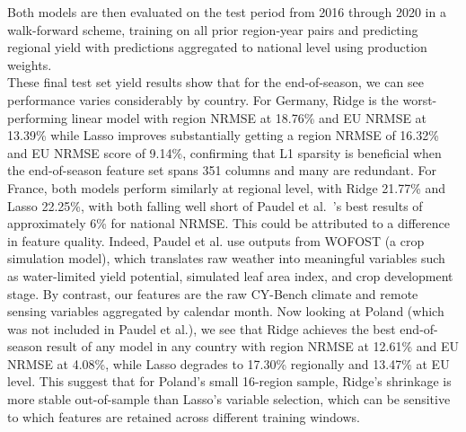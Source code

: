 \documentclass[pdflatex,sn-mathphys-num, oneside, 11pt]{sn-jnl}%
\theoremstyle{thmstyleone}%
\theoremstyle{thmstyletwo}%
\theoremstyle{thmstylethree}%
\begin{document}
Both models are then evaluated on the test period from 2016 through 2020 in a walk-forward scheme, training on all prior region-year pairs and predicting regional yield with predictions aggregated to national level using production weights.\\

These final test set yield results show that for the end-of-season, we can see performance varies considerably by country. For Germany, Ridge is the worst-performing linear model with region NRMSE at 18.76\% and EU NRMSE at 13.39\% while Lasso improves substantially getting a region NRMSE of 16.32\% and EU NRMSE score of 9.14\%, confirming that L1 sparsity is beneficial when the end-of-season feature set spans 351 columns and many are redundant. For France, both models perform similarly at regional level, with Ridge 21.77\% and Lasso 22.25\%, with both falling well short of Paudel et al.~\cite{bib16}'s best results of approximately 6\% for national NRMSE. This could be attributed to a difference in feature quality. Indeed, Paudel et al. use outputs from WOFOST (a crop simulation model), which translates raw weather into meaningful variables such as water-limited yield potential, simulated leaf area index, and crop development stage. By contrast, our features are the raw CY-Bench climate and remote sensing variables aggregated by calendar month. Now looking at  Poland (which was not included in Paudel et al.\cite{bib16}), we see that Ridge achieves the best end-of-season result of any model in any country with region NRMSE at 12.61\% and EU NRMSE at 4.08\%, while Lasso degrades to 17.30\% regionally and 13.47\% at EU level. This suggest that for Poland's small 16-region sample, Ridge's shrinkage is more stable out-of-sample than Lasso's variable selection, which can be sensitive to which features are retained across different training windows.\\
\end{document}
